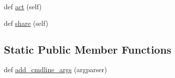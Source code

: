 \begin{DoxyCompactItemize}
\item 
def \hyperlink{classprojects_1_1wizard__of__wikipedia_1_1interactive__retrieval_1_1interactive__retrieval_1_1InteractiveRetrievalAgent_a637d3bd64317b3ba691ab6eac90b4788}{act} (self)
\item 
def \hyperlink{classprojects_1_1wizard__of__wikipedia_1_1interactive__retrieval_1_1interactive__retrieval_1_1InteractiveRetrievalAgent_a93125f9d9285d48730fda4545b642f00}{share} (self)
\end{DoxyCompactItemize}
\subsection*{Static Public Member Functions}
\begin{DoxyCompactItemize}
\item 
def \hyperlink{classprojects_1_1wizard__of__wikipedia_1_1interactive__retrieval_1_1interactive__retrieval_1_1InteractiveRetrievalAgent_a76b3efdd3e25c94f9532fe4d67df66b3}{add\+\_\+cmdline\+\_\+args} (argparser)
\end{DoxyCompactItemize}
